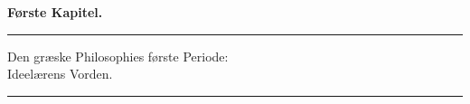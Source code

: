 \documentclass[12pt,a4paper]{book}
\newcommand{\divrule}{\begin{center}\rule{2cm}{0.4pt}\end{center}}
\begin{document}
\begin{center}
{\Large\textbf{Første Kapitel.}}
\end{center}
\divrule
\begin{center}
{\Large Den græske Philosophies første Periode:\\
Ideelærens Vorden.}
\end{center}
\divrule
\end{document}
